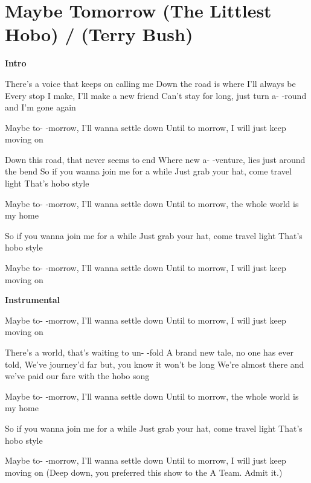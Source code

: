 \section{Maybe Tomorrow (The Littlest Hobo) / (Terry Bush)}\label{sec:maybe_tomorrow_(the_littlest_hobo)}
\textbf{Intro}

There's a voice that keeps on calling me
Down the road is where I'll always be
Every stop I make, I'll make a new friend
Can't stay for long, just turn a- -round
and I'm gone again

Maybe to- -morrow, I'll wanna settle down 
Until to morrow, I will just keep moving on

Down this road, that never seems to end
Where new a- -venture, lies just around the bend
So if you wanna join me for a while
Just grab your hat, come travel light
That's hobo style

Maybe to- -morrow, I'll wanna settle down 
Until to morrow, the whole world is my home

So if you wanna join me for a while
Just grab your hat, come travel light
That's hobo style

Maybe to- -morrow, I'll wanna settle down 
Until to morrow, I will just keep moving on

\textbf{Instrumental}

Maybe to- -morrow, I'll wanna settle down 
Until to morrow, I will just keep moving on

There's a world, that's waiting to un- -fold
A brand new tale, no one has ever told,
We've journey'd far but, you know it won't be long
We're almost there and we've paid our fare with the
hobo song

Maybe to- -morrow, I'll wanna settle down 
Until to morrow, the whole world is my home

So if you wanna join me for a while
Just grab your hat, come travel light
That's hobo style

Maybe to- -morrow, I'll wanna settle down 
Until to morrow, I will just keep moving on
{\tiny (Deep down, you preferred this show to the A Team. Admit it.)}
